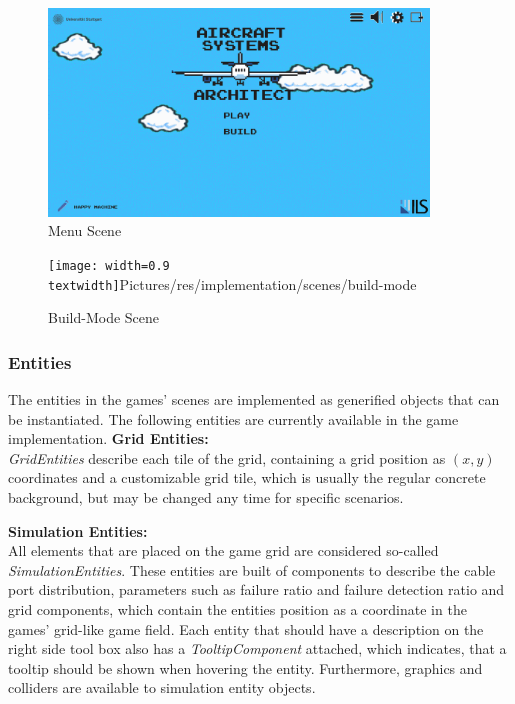 \begin{figure}
    \centering
        \includegraphics[width=0.9\textwidth]{Pictures/res/implementation/scenes/main-menu}
    \caption{Menu Scene}
    \label{fig:menu-scene}
\end{figure}

\begin{figure}
    \centering
    \texttt{[image: width=0.9\\textwidth]}{Pictures/res/implementation/scenes/build-mode}
    \caption{Build-Mode Scene}
    \label{fig:build-mode}
\end{figure}

\subsubsection{Entities}\label{subsubsec:entities2}
The entities in the games' scenes are implemented as generified objects that can be instantiated.
The following entities are currently available in the game implementation.
\textbf{Grid Entities:} \\
\textit{GridEntities} describe each tile of the grid, containing a grid position as $(x,y)$ coordinates and a customizable grid tile,
which is usually the regular concrete background, but may be changed any time for specific scenarios.

\textbf{Simulation Entities:} \\
All elements that are placed on the game grid are considered so-called \textit{SimulationEntities}.
These entities are built of components to describe the cable port distribution, parameters such as failure ratio and failure detection ratio and grid components, which contain the
entities position as a coordinate in the games' grid-like game field.
Each entity that should have a description on the right side tool box also has a \textit{TooltipComponent} attached, which indicates, that
a tooltip should be shown when hovering the entity.
Furthermore, graphics and colliders are available to simulation entity objects.

